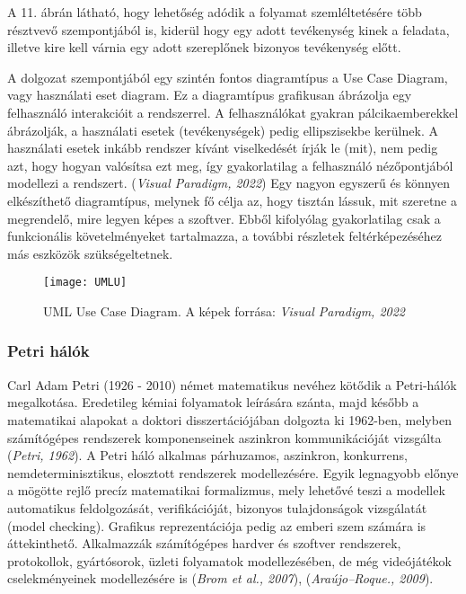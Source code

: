 \documentclass[12pt]{article}
\begin{document}
A 11. ábrán látható, hogy lehetőség adódik a folyamat szemléltetésére több résztvevő szempontjából is, kiderül hogy egy adott tevékenység kinek a feladata, illetve kire kell várnia egy adott szereplőnek bizonyos tevékenység előtt.

A dolgozat szempontjából egy szintén fontos diagramtípus a Use Case Diagram, vagy használati eset diagram. Ez a diagramtípus grafikusan ábrázolja egy felhasználó interakcióit a rendszerrel. A felhasználókat gyakran pálcikaemberekkel ábrázolják, a használati esetek (tevékenységek) pedig ellipszisekbe kerülnek. A használati esetek inkább rendszer kívánt viselkedését írják le (mit), nem pedig azt, hogy hogyan valósítsa ezt meg, így gyakorlatilag a felhasználó nézőpontjából modellezi a rendszert. (\textit{Visual Paradigm, 2022}) Egy nagyon egyszerű és könnyen elkészíthető diagramtípus, melynek fő célja az, hogy tisztán lássuk, mit szeretne a megrendelő, mire legyen képes a szoftver. Ebből kifolyólag gyakorlatilag csak a funkcionális követelményeket tartalmazza, a további részletek feltérképezéséhez más eszközök szükségeltetnek.

\begin{figure}
\centering
\texttt{[image: UMLU]}
\caption{UML Use Case Diagram. A képek forrása:  \textit{Visual Paradigm, 2022}
}
\end{figure}


\subsubsection{Petri hálók}

Carl Adam Petri (1926 - 2010) német matematikus nevéhez kötődik a Petri-hálók megalkotása. Eredetileg kémiai folyamatok leírására szánta, majd később a matematikai alapokat a doktori disszertációjában dolgozta ki 1962-ben, melyben számítógépes rendszerek komponenseinek aszinkron kommunikációját vizsgálta  (\textit{Petri, 1962}). A Petri háló alkalmas párhuzamos, aszinkron, konkurrens, nemdeterminisztikus, elosztott rendszerek modellezésére. Egyik legnagyobb előnye a mögötte rejlő precíz matematikai formalizmus, mely lehetővé teszi a modellek automatikus feldolgozását, verifikációját, bizonyos tulajdonságok vizsgálatát (model checking).  Grafikus reprezentációja pedig az emberi szem számára is áttekinthető.
Alkalmazzák számítógépes hardver és szoftver rendszerek, protokollok, gyártósorok, üzleti folyamatok modellezésében, de még videójátékok cselekményeinek modellezésére is  (\textit{Brom et al., 2007}),  (\textit{Araújo–Roque., 2009}). 
\end{document}
